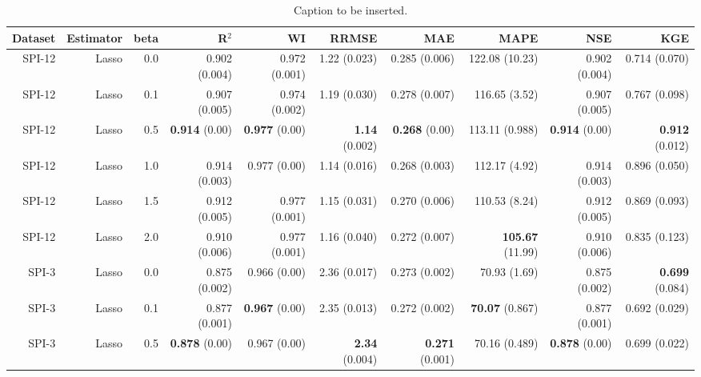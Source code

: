 \begin{table}
\centering
\caption{Caption to be inserted.}
\label{sp__comparison_datasets_table}
\begin{tabular}{rrrrrrrrrr}
\toprule
Dataset & Estimator &  beta &                 R$^2$ &                   WI &                RRMSE &                   MAE &                   MAPE &                   NSE &                   KGE \\
\midrule
 SPI-12 &     Lasso &   0.0 &         0.902 (0.004) &        0.972 (0.001) &         1.22 (0.023) &         0.285 (0.006) &         122.08 (10.23) &         0.902 (0.004) &         0.714 (0.070) \\
 SPI-12 &     Lasso &   0.1 &         0.907 (0.005) &        0.974 (0.002) &         1.19 (0.030) &         0.278 (0.007) &          116.65 (3.52) &         0.907 (0.005) &         0.767 (0.098) \\
 SPI-12 &     Lasso &   0.5 &   { \bf 0.914} (0.00) &  { \bf 0.977} (0.00) &  { \bf 1.14} (0.002) &   { \bf 0.268} (0.00) &         113.11 (0.988) &   { \bf 0.914} (0.00) &  { \bf 0.912} (0.012) \\
 SPI-12 &     Lasso &   1.0 &         0.914 (0.003) &         0.977 (0.00) &         1.14 (0.016) &         0.268 (0.003) &          112.17 (4.92) &         0.914 (0.003) &         0.896 (0.050) \\
 SPI-12 &     Lasso &   1.5 &         0.912 (0.005) &        0.977 (0.001) &         1.15 (0.031) &         0.270 (0.006) &          110.53 (8.24) &         0.912 (0.005) &         0.869 (0.093) \\
 SPI-12 &     Lasso &   2.0 &         0.910 (0.006) &        0.977 (0.001) &         1.16 (0.040) &         0.272 (0.007) &  { \bf 105.67} (11.99) &         0.910 (0.006) &         0.835 (0.123) \\
  SPI-3 &     Lasso &   0.0 &         0.875 (0.002) &         0.966 (0.00) &         2.36 (0.017) &         0.273 (0.002) &           70.93 (1.69) &         0.875 (0.002) &  { \bf 0.699} (0.084) \\
  SPI-3 &     Lasso &   0.1 &         0.877 (0.001) &  { \bf 0.967} (0.00) &         2.35 (0.013) &         0.272 (0.002) &   { \bf 70.07} (0.867) &         0.877 (0.001) &         0.692 (0.029) \\
  SPI-3 &     Lasso &   0.5 &   { \bf 0.878} (0.00) &         0.967 (0.00) &  { \bf 2.34} (0.004) &  { \bf 0.271} (0.001) &          70.16 (0.489) &   { \bf 0.878} (0.00) &         0.699 (0.022) \\

\end{tabular}
\end{table}
